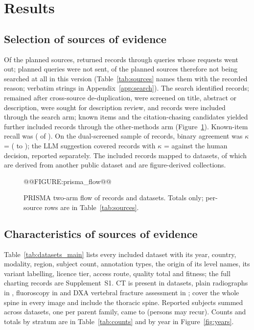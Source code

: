 \documentclass[11pt,a4paper]{article}
\newcommand{\tabref}[1]{Table~\ref{tab:#1}}
\newcommand{\figref}[1]{Figure~\ref{fig:#1}}
\begin{document}
\section{Results}

\subsection{Selection of sources of evidence}\label{sec:flow}
Of the \numwordSourcesPlanned{} planned sources, \numwordSourcesRun{} returned records through \numQueries{} queries whose requests went out; \numwordQueriesNotSent{} planned queries were not sent, \numwordSourcesNotSearched{} of the planned sources therefore not being searched at all in this version (\tabref{sources} names them with the recorded reason; verbatim strings in Appendix~\ref{app:search}). The search identified \numIdentified{} records; \numAfterMerge{} remained after cross-source de-duplication, \numScreened{} were screened on title, abstract or description, \numSoughtFullText{} were sought for description review, and \numwordIncludedRecordsSearch{} records were included through the search arm; \numwordKnownItems{} known items and the citation-chasing candidates yielded \numwordIncludedRecordsOther{} further included records through the other-methods arm (\figref{flow}). Known-item recall was \numRecallKnownItems{} (\numwordKnownRetrieved{} of \numwordKnownRecallDenominator). On the dual-screened sample of \numDualSample{} records, binary agreement was $\kappa$ = \numKappaDual{} (\numKappaDualLow{} to \numKappaDualHigh); the LLM suggestion covered \numLLMCovered{} records with $\kappa$ = \numKappaLLM{} against the human decision, reported separately. The included records mapped to \numwordDatasets{} datasets, of which \numwordDatasetsDerived{} are derived from another public dataset and \numwordDatasetsFigureDerived{} are figure-derived collections.

\begin{figure}[H]
\centering
@@FIGURE:prisma_flow@@
\caption{PRISMA two-arm flow of records and datasets. Totals only; per-source rows are in \tabref{sources}.}\label{fig:flow}
\end{figure}

\subsection{Characteristics of sources of evidence}\label{sec:characteristics}
\tabref{datasets_main} lists every included dataset with its year, country, modality, region, subject count, annotation types, the origin of its level names, its variant labelling, licence tier, access route, quality total and fitness; the full charting records are Supplement~S1. CT is present in \numwordDatasetsCT{} datasets, plain radiographs in \numwordDatasetsXR, fluoroscopy in \numwordDatasetsFluoro{} and DXA vertebral fracture assessment in \numwordDatasetsDXA; \numwordDatasetsWholeSpine{} cover the whole spine in every image and \numwordDatasetsThoracic{} include the thoracic spine. Reported subjects summed across datasets, one per parent family, came to \numSubjectsTotal{} (persons may recur). Counts and totals by stratum are in \tabref{counts} and by year in \figref{years}.
\end{document}
